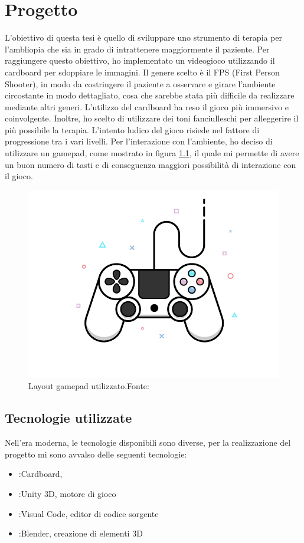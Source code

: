 \documentclass[
a4paper,
cleardoublepage=empty,
headings=twolinechapter,
numbers=autoenddot,
]{scrbook}
\begin{document}
    \chapter{Progetto}
     L'obiettivo di questa tesi è quello di sviluppare uno strumento di terapia per l'ambliopia che sia in grado di intrattenere maggiormente il paziente. Per raggiungere questo obiettivo, ho implementato un videogioco utilizzando il cardboard per sdoppiare le immagini. Il genere scelto è il FPS (First Person Shooter), in modo da costringere il paziente a osservare e girare l'ambiente circostante in modo dettagliato, cosa che sarebbe stata più difficile da realizzare mediante altri generi. L'utilizzo del cardboard ha reso il gioco più immersivo e coinvolgente. Inoltre, ho scelto di utilizzare dei toni fanciulleschi per alleggerire il più possibile la terapia. L'intento ludico del gioco risiede nel fattore di progressione tra i vari livelli. Per l'interazione con l'ambiente, ho deciso di utilizzare un gamepad, come mostrato in figura \ref{fig:gamepad}, il quale mi permette di avere un buon numero di tasti e di conseguenza maggiori possibilità di interazione con il gioco.
     \begin{figure}[H]
    	\centering
    	\includegraphics[width=0.8\linewidth]{image/gamepad}
    	\caption{Layout gamepad utilizzato.Fonte:\cite{controller_image}}
    	\label{fig:gamepad}
    \end{figure}
  
    \section{Tecnologie utilizzate}
    Nell'era moderna, le tecnologie disponibili sono diverse, per la realizzazione del progetto mi sono avvalso delle seguenti tecnologie:
    \begin{itemize}
    	\item:Cardboard, 
    	\item:Unity 3D, motore di gioco
    	\item:Visual Code, editor di codice sorgente
    	\item:Blender, creazione di elementi 3D
    \end{itemize}
\end{document}
